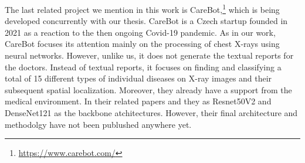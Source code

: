 The last related project we mention in this work is CareBot,\footnote[15]{\url{https://www.carebot.com/}} which is being developed concurrently with our thesis. CareBot is a Czech startup founded in 2021 as a reaction to the then ongoing Covid-19 pandemic. As in our work, CareBot focuses its attention mainly on the processing of chest X-rays using neural networks. However, unlike us, it does not generate the textual reports for the doctors. Instead of textual reports, it focuses on finding and classifying a total of 15 different types of individual diseases on X-ray images and their subsequent spatial localization. Moreover, they already have a support from the medical environment. In their related papers \citep{kvak2022towards} and \citep{kvak2021carebot} they as Resnet50V2 and DenseNet121 as the backbone atchitectures. However, their final architecture and methodolgy have not been publushed anywhere yet.











